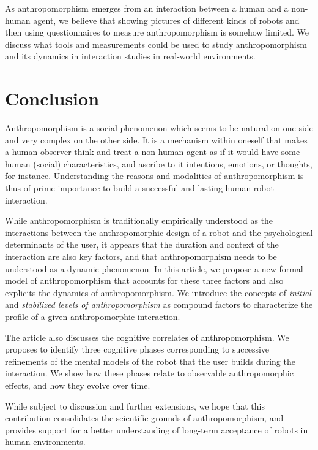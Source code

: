 \documentclass{frontiersSCNS} %
\begin{document}
As anthropomorphism emerges from an interaction between a human and a non-human agent, we believe that showing pictures of different kinds of robots and then using questionnaires to measure anthropomorphism is somehow limited. We discuss what tools and measurements could be used to study anthropomorphism and its dynamics in interaction studies in real-world environments.


%
%
%
%
%
%


\section{Conclusion}
\label{sec:conclusion}

Anthropomorphism is a social phenomenon which seems to be natural on one side
and very complex on the other side. It is a mechanism within oneself that makes
a human observer think and treat a non-human agent as if it would have some
human (social) characteristics, and ascribe to it intentions, emotions, or
thoughts, for instance. Understanding the reasons and modalities of
anthropomorphism is thus of prime importance to build a successful and lasting
human-robot interaction.

While anthropomorphism is traditionally empirically understood as the
interactions between the anthropomorphic design of a robot and the psychological
determinants of the user, it appears that the duration and context of the
interaction are also key factors, and that anthropomorphism needs to be
understood as a dynamic phenomenon. In this article, we propose a new formal
model of anthropomorphism that accounts for these three factors and also
explicits the dynamics of anthropomorphism. We introduce the concepts of
\emph{initial} and \emph{stabilized levels of anthropomorphism} as compound
factors to characterize the profile of a given anthropomorphic interaction.

The article also discusses the cognitive correlates of anthropomorphism. We
proposes to identify three cognitive phases corresponding to successive
refinements of the mental models of the robot that the user builds during the
interaction. We show how these phases relate to observable anthropomorphic
effects, and how they evolve over time.

While subject to discussion and further extensions, we hope that this
contribution consolidates the scientific grounds of anthropomorphism, and
provides support for a better understanding of long-term acceptance of robots in
human environments.
\end{document}
